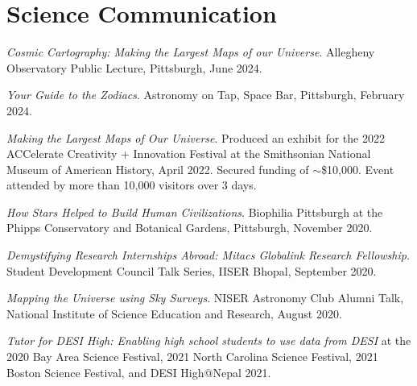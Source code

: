 \documentclass[10pt,a4paper,roman,]{moderncv} %
\begin{document}

\section{Science Communication}

 \begin{etaremune}[leftmargin=40pt,labelsep=10pt]
 \item \textit{Cosmic Cartography: Making the Largest Maps of our Universe}. Allegheny Observatory Public Lecture, Pittsburgh, June 2024.
 \item \textit{Your Guide to the Zodiacs}. Astronomy on Tap, Space Bar, Pittsburgh, February 2024.
 \item \textit{Making the Largest Maps of Our Universe}. Produced an exhibit for the 2022 ACCelerate Creativity + Innovation Festival at the Smithsonian National Museum of American History, April 2022. Secured funding of $\sim$\$10,000. Event attended by more than 10,000 visitors over 3 days. 
 \item \textit{How Stars Helped to Build Human Civilizations}. Biophilia Pittsburgh at the Phipps Conservatory and Botanical Gardens, Pittsburgh, November 2020.
\item \textit{Demystifying Research Internships Abroad: Mitacs Globalink Research Fellowship}. Student Development
Council Talk Series, IISER Bhopal, September 2020.
\item \textit{Mapping the Universe using Sky Surveys}. NISER Astronomy Club Alumni Talk, National Institute of Science Education and Research, August 2020.
\item \textit{Tutor for DESI High: Enabling high school students to use data from DESI} at the 2020 Bay Area Science Festival, 2021 North Carolina Science Festival, 2021 Boston Science Festival, and DESI High@Nepal 2021.
\end{etaremune}
\end{document}

